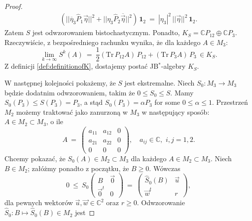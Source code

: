 \begin{proof}
\begin{multline}
\left( || \overline{\eta}_{3} \hat{P}_{1} \vec{\eta} ||^{2} +
    || \eta_{3} \hat{P}_{2} \overline{\vec{\eta}} ||^{2} \right) \, \mathbf{1}_{2}
    \: = \:
|\eta_{3}|^{2} \, ||\vec{\eta}||^{2} \, \mathbf{1}_{2}.
\end{multline}
Zatem $S$ jest odwzorowaniem bistochastycznym.
Ponadto,
$K_{S}= \mathbb{C} P_{12} \oplus \mathbb{C} P_{3}$.
Rzeczywiście,
z bezpośredniego rachunku wynika, że dla każdego $A \in M_{3}$:
\begin{equation}
\lim \limits_{k \rightarrow \infty} S^{k}(A) \:=\:
\frac{1}{2} (\text{Tr} \, P_{12} A )\, P_{12} +
    (\text{Tr} \, P_{3} A)\, P_{3} \, \in K_{S}.
\end{equation}
Z definicji \eqref{def:definitionofK},
dostajemy postać JB$^{*}$-algebry $K_{S}$.

W następnej kolejności pokażemy, że $S$ jest ekstremalne.
Niech $S_{0}: M_{3} \rightarrow M_{3}$ będzie dodatnim odwzorowaniem,
takim że
$0 \leq S_{0} \leq S$.
Mamy $S_{0}(P_{3}) \leq S(P_{3}) = P_{3}$,
a stąd $S_{0}(P_{3}) = \alpha P_{3}$ for some $0 \leq \alpha \leq 1$.
Przestrzeń $M_{2}$ możemy traktować jako zanurzoną w $M_{3}$
w następujący sposób:
$A \in M_{2} \! \subset \! M_{3}$, o ile
\begin{equation}
\label{RandomLabel:450031}
    A \: = \: \left( \begin{array}{ccc}
    a_{11} & a_{12} & 0 \\
    a_{21} & a_{22} & 0 \\
    0 & 0 & 0
    \end{array} \right), \quad
    a_{ij} \in \mathbb{C}, \,\, i,j = 1,2.
\end{equation}
Chcemy pokazać, że $S_{0}(A) \in M_{2} \! \subset \! M_{3}$
dla każdego $A \in M_{2} \! \subset \! M_{3}$.
Niech $B \in M_{2}$; załóżmy ponadto z początku, że $B \geq 0$.
Wówczas
\begin{equation}
\label{eq:SMapsM2intoM2}
 0 \:\leq\: S_{0} \begin{pmatrix}
               B & \vec{0} \\ \vec{0}^{t} & 0
              \end{pmatrix} \: = \:
 \begin{pmatrix}
  \hat{S}_{0}(B) & \vec{u} \\ \vec{w}^{t} & r
 \end{pmatrix},
\end{equation}
dla pewnych wektorów $\vec{u}, \vec{w} \in \mathbb{C}^{2}$ oraz $r \geq 0$.
Odwzorowanie $\hat{S}_{0}:B \mapsto \hat{S}_{0}(B) \in M_{2}$ jest

\end{proof}

